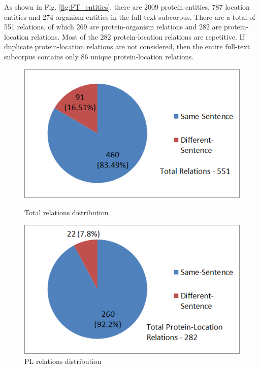 As shown in Fig. \ref{fig:FT_entities}, there are 2009 protein entities, 787 location entities and 274 organism entities in the full-text subcorpus. There are a total of 551 relations, of which 269 are protein-organism relations and 282 are protein-location relations. Most of the 282 protein-location relations are repetitive. If duplicate protein-location relations are not considered, then the entire full-text subcorpus contains only 86 unique protein-location relations.

\begin{figure}
\centering
\begin{minipage}{.5\textwidth}
  \centering
  \includegraphics[width=.95\textwidth]{figures/2_FTTotalRelDist.png}
  \caption{Total relations distribution}
  \label{fig:FT_RelDist}
\end{minipage}%
\begin{minipage}{.5\textwidth}
  \centering
  \includegraphics[width=.95\textwidth]{figures/2_FTPLRelDist.png}
  \caption{PL relations distribution}
  \label{fig:FT_PLRelDist}
\end{minipage}
\end{figure}

